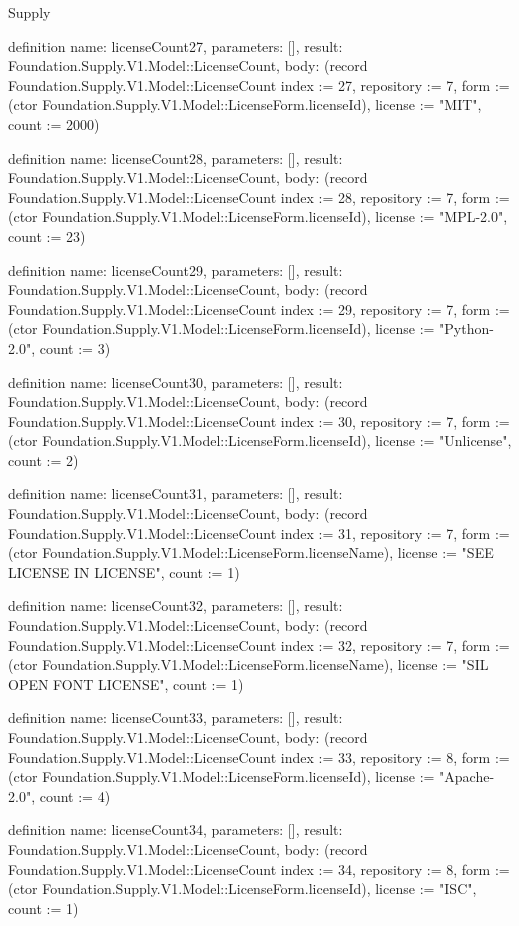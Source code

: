 \begin{lexlean}{Supply}
\begin{semanticmodule}
definition{
  name: licenseCount27,
  parameters: [],
  result: Foundation.Supply.V1.Model::LicenseCount,
  body: (record Foundation.Supply.V1.Model::LicenseCount {index := 27, repository := 7, form := (ctor Foundation.Supply.V1.Model::LicenseForm.licenseId), license := "MIT", count := 2000})
}

definition{
  name: licenseCount28,
  parameters: [],
  result: Foundation.Supply.V1.Model::LicenseCount,
  body: (record Foundation.Supply.V1.Model::LicenseCount {index := 28, repository := 7, form := (ctor Foundation.Supply.V1.Model::LicenseForm.licenseId), license := "MPL-2.0", count := 23})
}

definition{
  name: licenseCount29,
  parameters: [],
  result: Foundation.Supply.V1.Model::LicenseCount,
  body: (record Foundation.Supply.V1.Model::LicenseCount {index := 29, repository := 7, form := (ctor Foundation.Supply.V1.Model::LicenseForm.licenseId), license := "Python-2.0", count := 3})
}

definition{
  name: licenseCount30,
  parameters: [],
  result: Foundation.Supply.V1.Model::LicenseCount,
  body: (record Foundation.Supply.V1.Model::LicenseCount {index := 30, repository := 7, form := (ctor Foundation.Supply.V1.Model::LicenseForm.licenseId), license := "Unlicense", count := 2})
}

definition{
  name: licenseCount31,
  parameters: [],
  result: Foundation.Supply.V1.Model::LicenseCount,
  body: (record Foundation.Supply.V1.Model::LicenseCount {index := 31, repository := 7, form := (ctor Foundation.Supply.V1.Model::LicenseForm.licenseName), license := "SEE LICENSE IN LICENSE", count := 1})
}

definition{
  name: licenseCount32,
  parameters: [],
  result: Foundation.Supply.V1.Model::LicenseCount,
  body: (record Foundation.Supply.V1.Model::LicenseCount {index := 32, repository := 7, form := (ctor Foundation.Supply.V1.Model::LicenseForm.licenseName), license := "SIL OPEN FONT LICENSE", count := 1})
}

definition{
  name: licenseCount33,
  parameters: [],
  result: Foundation.Supply.V1.Model::LicenseCount,
  body: (record Foundation.Supply.V1.Model::LicenseCount {index := 33, repository := 8, form := (ctor Foundation.Supply.V1.Model::LicenseForm.licenseId), license := "Apache-2.0", count := 4})
}

definition{
  name: licenseCount34,
  parameters: [],
  result: Foundation.Supply.V1.Model::LicenseCount,
  body: (record Foundation.Supply.V1.Model::LicenseCount {index := 34, repository := 8, form := (ctor Foundation.Supply.V1.Model::LicenseForm.licenseId), license := "ISC", count := 1})
}


\end{semanticmodule}
\end{lexlean}
